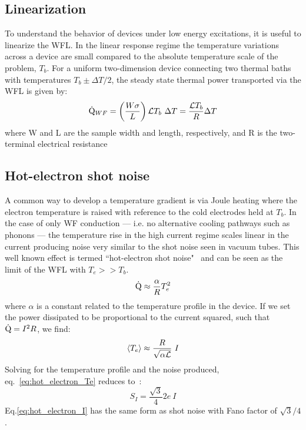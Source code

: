 \subsection{Linearization}
To understand the behavior of devices under low energy excitations, it is useful to linearize the WFL. In the linear response regime the temperature variations across a device are small compared to the absolute temperature scale of the problem, $T_b$. For a uniform two-dimension device connecting two thermal baths with temperatures $T_b \pm\Delta T/2$, the steady state thermal power transported via the WFL is given by:
\begin{equation}\label{eq:QWF}
\dot{\mathrm{Q}}_{WF} = \left(\frac{W\sigma}{L}\right)\mathcal{L} T_b~\Delta T = \frac{\mathcal{L} T_b}{R}\Delta T
\end{equation}
where W and L are the sample width and length, respectively, and R is the two-terminal electrical resistance
\subsection{Hot-electron shot noise}
A common way to develop a temperature gradient is via Joule heating where the electron temperature is raised with reference to the cold electrodes held at $T_b$. In the case of only WF conduction --- i.e. no alternative cooling pathways such as phonons --- the temperature rise in the high current regime scales linear in the current producing noise very similar to the shot noise seen in vacuum tubes. This well known effect is termed ``hot-electron shot noise"~\cite{steinbach_observation_1996,blanter_shot_2000,de_jong_semiclassical_1996} and can be seen as the limit of the WFL with $T_e >> T_b$.
\begin{equation}\label{eq:hot_electron_Q}
\dot{\mathrm{Q}} \approx \frac{\alpha\sl}{R}T_e^2
\end{equation}
where $\alpha$ is a constant related to the temperature profile in the device. If we set the power dissipated to be proportional to the current squared, such that $\dot{\mathrm{Q}} = I^2R$, we find:
\begin{equation}\label{eq:hot_electron_Te}
\langle T_e\rangle \approx \frac{R}{\sqrt{\alpha\mathcal{L}}}~I
\end{equation}
Solving for the temperature profile and the noise produced, eq.~\ref{eq:hot_electron_Te} reduces to~\cite{martinez??}:
\begin{equation}\label{eq:hot_electron_I}
S_I = \frac{\sqrt{3}}{4}2e~I
\end{equation}
Eq.\ref{eq:hot_electron_I} has the same form as shot noise with Fano factor of $\sqrt{3}/4$.


